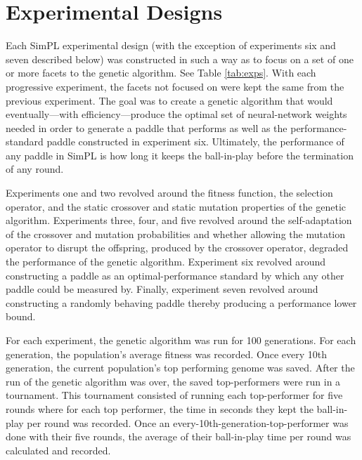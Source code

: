 \section{Experimental Designs}

Each SimPL experimental design (with the exception of experiments six and seven described below) was constructed in such a way as to focus on a set of one or more facets to the genetic algorithm. See Table \ref{tab:exps}. With each progressive experiment, the facets not focused on were kept the same from the previous experiment. The goal was to create a genetic algorithm that would eventually---with efficiency---produce the optimal set of neural-network weights needed in order to generate a paddle that performs as well as the performance-standard paddle constructed in experiment six. Ultimately, the performance of any paddle in SimPL is how long it keeps the ball-in-play before the termination of any round.       

Experiments one and two revolved around the fitness function, the selection operator, and the static crossover and static mutation properties of the genetic algorithm. Experiments three, four, and five revolved around the self-adaptation of the crossover and mutation probabilities and whether allowing the mutation operator to disrupt the offspring, produced by the crossover operator, degraded the performance of the genetic algorithm. Experiment six revolved around constructing a paddle as an optimal-performance standard by which any other paddle could be measured by. Finally, experiment seven revolved around constructing a randomly behaving paddle thereby producing a performance lower bound.

For each experiment, the genetic algorithm was run for 100 generations. For each generation, the population's average fitness was recorded. Once every 10th generation, the current population's top performing genome was saved. After the run of the genetic algorithm was over, the saved top-performers were run in a tournament. This tournament consisted of running each top-performer for five rounds where for each top performer, the time in seconds they kept the ball-in-play per round was recorded. Once an every-10th-generation-top-performer was done with their five rounds, the average of their ball-in-play time per round was calculated and recorded.

